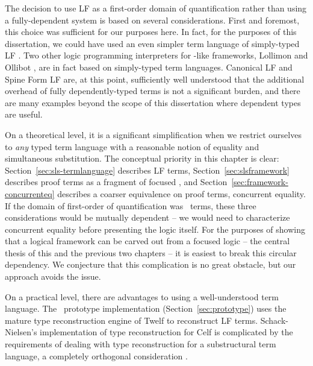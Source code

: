 The decision to use LF as a first-order domain of quantification
rather than using a fully-dependent system is based on several
considerations. First and foremost, this choice was sufficient for our
purposes here. In fact, for the purposes of this dissertation, we
could have used an even simpler term language of simply-typed LF
\cite{pfenning08church}. Two other logic programming interpreters for
\sls-like frameworks, Lollimon \cite{lopez05monadic} and Ollibot
\cite{pfenning09substructural}, are in fact based on simply-typed term
languages. Canonical LF and Spine Form LF are, at this point,
sufficiently well understood that the additional overhead of fully
dependently-typed terms is not a significant burden, and there are
many examples beyond the scope of this dissertation where dependent types are
useful.

On a theoretical level, it is a significant simplification when we
restrict ourselves to {\it any} typed term language with a reasonable
notion of equality and simultaneous substitution. The conceptual
priority in this chapter is clear: Section~\ref{sec:sls-termlanguage}
describes LF terms, Section~\ref{sec:slsframework} describes proof
terms as a fragment of focused \ollll, and
Section~\ref{sec:framework-concurrenteq} describes a coarser
equivalence on proof terms, concurrent equality. If the domain of
first-order of quantification was \sls~terms, these three
considerations would be mutually dependent -- we would need to
characterize concurrent equality before presenting the logic
itself. For the purposes of showing that a logical framework can be
carved out from a focused logic -- the central thesis of this and the
previous two chapters -- it is easiest to break this circular
dependency. We conjecture that this complication is no great obstacle,
but our approach avoids the issue.

On a practical level, there are advantages to using a well-understood
term language. The \sls~prototype implementation
(Section~\ref{sec:prototype}) uses the mature type reconstruction
engine of Twelf to reconstruct LF terms. Schack-Nielsen's
implementation of type reconstruction for Celf is complicated by the
requirements of dealing with type reconstruction for a substructural
term language, a completely orthogonal consideration \cite{schacknielsen08celf}. 

